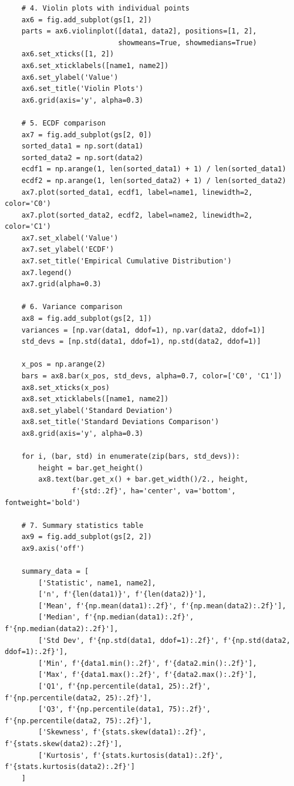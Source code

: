 \begin{lstlisting}
    # 4. Violin plots with individual points
    ax6 = fig.add_subplot(gs[1, 2])
    parts = ax6.violinplot([data1, data2], positions=[1, 2],
                           showmeans=True, showmedians=True)
    ax6.set_xticks([1, 2])
    ax6.set_xticklabels([name1, name2])
    ax6.set_ylabel('Value')
    ax6.set_title('Violin Plots')
    ax6.grid(axis='y', alpha=0.3)

    # 5. ECDF comparison
    ax7 = fig.add_subplot(gs[2, 0])
    sorted_data1 = np.sort(data1)
    sorted_data2 = np.sort(data2)
    ecdf1 = np.arange(1, len(sorted_data1) + 1) / len(sorted_data1)
    ecdf2 = np.arange(1, len(sorted_data2) + 1) / len(sorted_data2)
    ax7.plot(sorted_data1, ecdf1, label=name1, linewidth=2, color='C0')
    ax7.plot(sorted_data2, ecdf2, label=name2, linewidth=2, color='C1')
    ax7.set_xlabel('Value')
    ax7.set_ylabel('ECDF')
    ax7.set_title('Empirical Cumulative Distribution')
    ax7.legend()
    ax7.grid(alpha=0.3)

    # 6. Variance comparison
    ax8 = fig.add_subplot(gs[2, 1])
    variances = [np.var(data1, ddof=1), np.var(data2, ddof=1)]
    std_devs = [np.std(data1, ddof=1), np.std(data2, ddof=1)]

    x_pos = np.arange(2)
    bars = ax8.bar(x_pos, std_devs, alpha=0.7, color=['C0', 'C1'])
    ax8.set_xticks(x_pos)
    ax8.set_xticklabels([name1, name2])
    ax8.set_ylabel('Standard Deviation')
    ax8.set_title('Standard Deviations Comparison')
    ax8.grid(axis='y', alpha=0.3)

    for i, (bar, std) in enumerate(zip(bars, std_devs)):
        height = bar.get_height()
        ax8.text(bar.get_x() + bar.get_width()/2., height,
                f'{std:.2f}', ha='center', va='bottom', fontweight='bold')

    # 7. Summary statistics table
    ax9 = fig.add_subplot(gs[2, 2])
    ax9.axis('off')

    summary_data = [
        ['Statistic', name1, name2],
        ['n', f'{len(data1)}', f'{len(data2)}'],
        ['Mean', f'{np.mean(data1):.2f}', f'{np.mean(data2):.2f}'],
        ['Median', f'{np.median(data1):.2f}', f'{np.median(data2):.2f}'],
        ['Std Dev', f'{np.std(data1, ddof=1):.2f}', f'{np.std(data2, ddof=1):.2f}'],
        ['Min', f'{data1.min():.2f}', f'{data2.min():.2f}'],
        ['Max', f'{data1.max():.2f}', f'{data2.max():.2f}'],
        ['Q1', f'{np.percentile(data1, 25):.2f}', f'{np.percentile(data2, 25):.2f}'],
        ['Q3', f'{np.percentile(data1, 75):.2f}', f'{np.percentile(data2, 75):.2f}'],
        ['Skewness', f'{stats.skew(data1):.2f}', f'{stats.skew(data2):.2f}'],
        ['Kurtosis', f'{stats.kurtosis(data1):.2f}', f'{stats.kurtosis(data2):.2f}']
    ]


\end{lstlisting}
